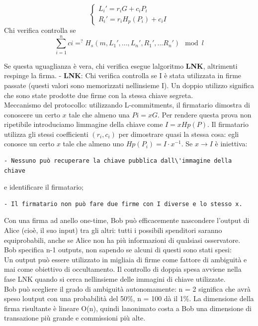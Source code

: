 \[ \begin{cases}
L_i' = r_iG + c_iP_i \\
R_i' = r_iH_p(P_i) + c_iI
\end{cases}
 \] Chi verifica controlla se
\[\sum_{i=1}^{n} ci =^? H_s(m,L_1',...,L_n',R_1',...R_n') \mod l \]

Se questa uguaglianza è vera, chi verifica esegue
l\textquotesingle algoritmo \textbf{LNK}, altrimenti respinge la firma.
- \textbf{LNK}: Chi verifica controlla se I è stata utilizzata in firme
passate (questi valori sono memorizzati nell\textquotesingle insieme I).
Un doppio utilizzo significa che sono state prodotte due firme con la
stessa chiave segreta.\\
Meccanismo del protocollo: utilizzando L-commitments, il firmatario
dimostra di conoscere un certo $x$ tale che almeno una $Pi = xG$.
Per rendere
questa prova non ripetibile introduciamo l\textquotesingle immagine
della chiave come $I=xHp(P)$. Il firmatario utilizza gli stessi
coefficienti $(r_i,c_i)$ per dimostrare quasi la stessa cosa: egli conosce
un certo $x$ tale che almeno uno $Hp(P_i)=I \cdot x^{-1}$. Se $x \rightarrow I$ è iniettiva:

\begin{verbatim}
- Nessuno può recuperare la chiave pubblica dall\'immagine della chiave
\end{verbatim}

e identificare il firmatario;

\begin{verbatim}
- Il firmatario non può fare due firme con I diverse e lo stesso x.
\end{verbatim}

Con una firma ad anello one-time, Bob può efficacemente nascondere
l'output di Alice (cioè, il suo input) tra gli altri: tutti i possibili
spenditori saranno equiprobabili, anche se Alice non ha più informazioni
di qualsiasi osservatore. Bob specifica n-1 outputs, non sapendo se
alcuni di questi sono stati spesi:\\
Un output può essere utilizzato in migliaia di firme come fattore di
ambiguità e mai come obiettivo di occultamento. Il controllo di doppia
spesa avviene nella fase LNK quando si cerca
nell\textquotesingle insieme delle immagini di chiave utilizzate.\\
Bob può scegliere il grado di ambiguità autonomamente: n = 2 significa
che avrà speso l\textquotesingle output con una probabilità del 50\%, n
= 100 dà il 1\%. La dimensione della firma risultante è lineare O(n),
quindi l\textquotesingle anonimato costa a Bob una dimensione di
transazione più grande e commissioni più alte.

